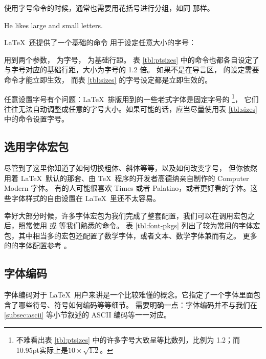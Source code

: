 使用字号命令的时候，通常也需要用花括号进行分组，如同  那样。
\begin{example}
He likes {\LARGE large and
{\small small} letters}.
\end{example}

\LaTeX\ 还提供了一个基础的命令  用于设定任意大小的字号：
\begin{command}
\end{command}

 用到两个参数， 为字号， 为基础行距。
表 \ref{tbl:ptsizes} 中的命令也都各自设定了与字号对应的基础行距，大小为字号的 1.2 倍。
如果不是在导言区， 的设定需要  命令才能立即生效，
而表 \ref{tbl:sizes} 的字号设定都是立即生效的。

任意设置字号有个问题：\LaTeX\ 排版用到的一些老式字体是固定字号的%
\footnote{不难看出表 \ref{tbl:ptsizes} 中的许多字号大致呈等比数列，比例为 1.2；而10.95pt实际上是$10\times\sqrt{1.2}$。}，
它们往往无法自动调整成任意的字号大小。如果可能的话，应当尽量使用表 \ref{tbl:sizes} 中的命令设置字号。

\subsection{选用字体宏包}\label{subsec:font-pkgs}

尽管到了这里你知道了如何切换粗体、斜体等等，以及如何改变字号，
但你依然用着 \LaTeX\ 默认的那套、由 \TeX\ 程序的开发者高德纳亲自制作的 Computer Modern 字体。
有的人可能很喜欢 Times 或者 Palatino，或者更好看的字体。这些字体样式的自由设置在 \LaTeX\ 里还不太容易。

幸好大部分时候，许多字体宏包为我们完成了整套配置，我们可以在调用宏包之后，照常使用  或  等我们熟悉的命令。
表 \ref{tbl:font-pkgs} 列出了较为常用的字体宏包，其中相当多的宏包还配置了数学字体，或者文本、数学字体兼而有之。
更多的的字体配置参考 \cite{survey,fontcatalogue}。

\subsection{字体编码}\label{subsec:font-encs}

字体编码对于 \LaTeX\ 用户来讲是一个比较难懂的概念。它指定了一个字体里面包含了哪些符号、符号如何编码等等细节。
需要明确一点：字体编码并不与我们在 \ref{subsec:ascii} 等小节叙述的 ASCII 编码等一一对应。

